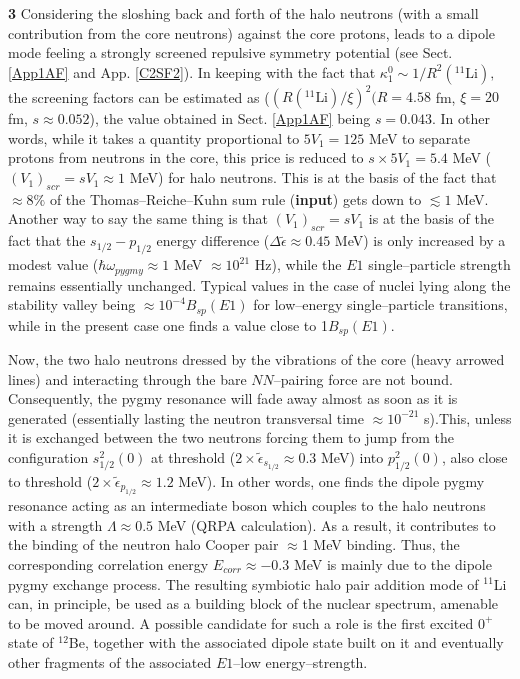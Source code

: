 \textbf{3} Considering the sloshing back and forth of the halo neutrons (with a small contribution from the core neutrons) against the core protons, leads to a dipole mode feeling a strongly screened repulsive symmetry potential (see Sect. \ref{App1AF} and App. \ref{C2SF2}). In keeping with the fact that $\kappa_1^0\sim1/R^2(^{11}\text{Li}),$ the screening factors can be estimated as ($(R(^{11}\text{Li})/\xi)^2(R=4.58$  fm, $\xi=20$ fm, $s\approx0.052$), the value obtained in Sect. \ref{App1AF} being $s=0.043$. In other words, while it takes  a quantity proportional to $5V_1=125$ MeV to separate protons from neutrons in the core, this price is reduced to $s\times 5 V_1=5.4$ MeV ($(V_1)_{scr}=sV_1\approx1$ MeV) for halo neutrons. This is at the basis of the fact that $\approx 8\%$ of the Thomas--Reiche--Kuhn sum rule (\textbf{input}) gets down to $\lesssim 1$ MeV. Another way to say the same thing is that $(V_1)_{scr}=sV_1$ is at the basis of the fact that the $s_{1/2}- p_{1/2}$ energy difference ($\Delta \tilde\epsilon\approx 0.45$ MeV) is only increased by a modest value ($\hbar \omega_{pygmy}\approx 1$ MeV $\approx 10^{21}$ Hz), while the $E1$  single--particle strength remains essentially unchanged. Typical values in the case of nuclei lying along the stability valley being $\approx 10^{-4} B_{sp} (E1)$ for  low--energy  single--particle transitions, while in the present case one finds a value close to 1$B_{sp}(E1)$. 


Now, the two halo neutrons dressed by the vibrations of the core (heavy arrowed lines) and interacting through the bare $NN$--pairing force are not bound. Consequently, the pygmy resonance will fade away almost as soon as it is generated (essentially lasting the neutron transversal time $\approx 10^{-21}$ s).This, unless it is exchanged between the two neutrons forcing them to jump from the configuration $s^{2}_{1/2}(0)$ at threshold ($2\times\tilde\epsilon_{s_{1/2}}\approx 0.3$ MeV) into  $p^2_{1/2}(0)$, also close to threshold     ($2\times\tilde\epsilon_{p_{1/2}}\approx 1.2$ MeV). In other words, one finds the dipole pygmy resonance acting as an intermediate boson which  couples to the halo neutrons with a  strength $\Lambda\approx 0.5$ MeV (QRPA calculation). As a result, it contributes to the binding of the neutron halo Cooper pair  $\approx$1 MeV binding. Thus, the corresponding correlation energy $E_{corr}\approx-0.3$ MeV is mainly due to the dipole pygmy exchange process. The resulting symbiotic halo pair addition mode of $^{11}$Li can, in principle, be used as a building block of the nuclear spectrum, amenable to  be moved around. A possible candidate for such a role is the first excited $0^+$ state of $^{12}$Be, together with the associated dipole state built on it and eventually other fragments of the associated $E1$--low energy--strength.


